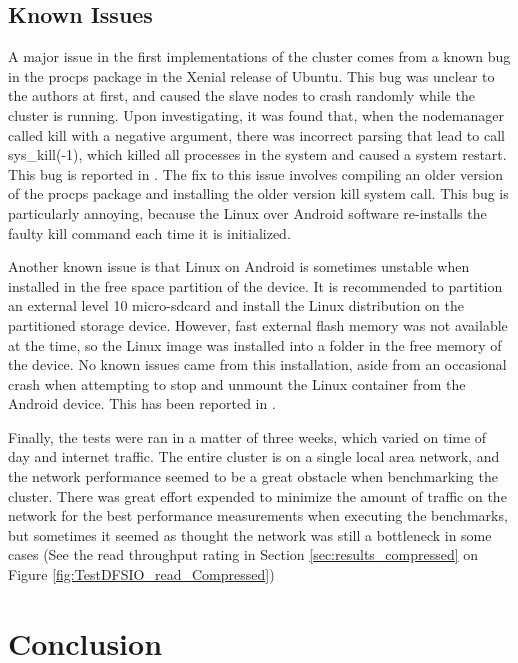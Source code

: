 \documentclass[10pt,journal,compsoc,float]{IEEEtran}
\begin{document}
\subsection{Known Issues}
\label{sec:known_issues}
A major issue in the first implementations of the cluster comes from a known bug in the procps package in the Xenial release of Ubuntu. This bug was unclear to the authors at first, and caused the slave nodes to crash randomly while the cluster is running. Upon investigating, it was found that, when the nodemanager called kill with a negative argument, there was incorrect parsing that lead to call sys\_kill(-1), which killed all processes in the system and caused a system restart. This bug is reported in \cite{Bug}. The fix to this issue involves compiling an older version of the procps package and installing the older version kill system call. This bug is particularly annoying, because the Linux over Android software re-installs the faulty kill command each time it is initialized.

Another known issue is that Linux on Android is sometimes unstable when installed in the free space partition of the device. It is recommended to partition an external level 10 micro-sdcard and install the Linux distribution on the partitioned storage device. However, fast external flash memory was not available at the time, so the Linux image was installed into a folder in the free memory of the device. No known issues came from this installation, aside from an occasional crash when attempting to stop and unmount the Linux container from the Android device. This has been reported in \cite{LinuxDeploy}.

Finally, the tests were ran in a matter of three weeks, which varied on time of day and internet traffic. The entire cluster is on a single local area network, and the network performance seemed to be a great obstacle when benchmarking the cluster. There was great effort expended to minimize the amount of traffic on the network for the best performance measurements when executing the benchmarks, but sometimes it seemed as thought the network was still a bottleneck in some cases (See the read throughput rating in Section \ref{sec:results_compressed} on Figure \ref{fig:TestDFSIO_read_Compressed})

\section{Conclusion}
\label{sec:conclusion}
\end{document}
